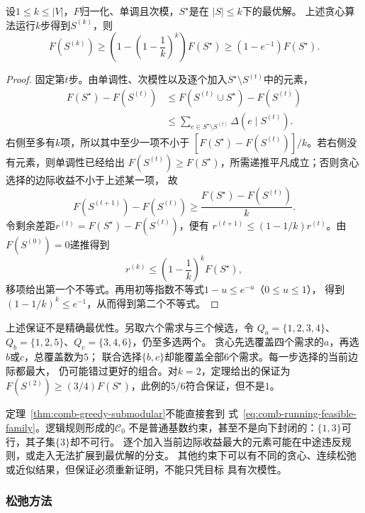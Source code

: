 \begin{theorem}[单调次模最大化的贪心界]
\label{thm:comb-greedy-submodular}
设$1\leq k\leq|V|$，$F$归一化、单调且次模，$S^\star$是在
$|S|\leq k$下的最优解。
上述贪心算法运行$k$步得到$S^{(k)}$，则
\begin{equation}
  F(S^{(k)})
  \geq
  \left(1-\left(1-\frac1k\right)^k\right)F(S^\star)
  \geq(1-e^{-1})F(S^\star).
  \label{eq:comb-greedy-bound}
\end{equation}
\end{theorem}

\begin{proof}
固定第$t$步。由单调性、次模性以及逐个加入$S^\star\setminus S^{(t)}$中的元素，
\begin{align*}
  F(S^\star)-F(S^{(t)})
  &\leq F(S^{(t)}\cup S^\star)-F(S^{(t)})\\
  &\leq\sum_{e\in S^\star\setminus S^{(t)}}\Delta(e\mid S^{(t)}).
\end{align*}
右侧至多有$k$项，所以其中至少一项不小于
$[F(S^\star)-F(S^{(t)})]/k$。若右侧没有元素，则单调性已经给出
$F(S^{(t)})\geq F(S^\star)$，所需递推平凡成立；否则贪心选择的边际收益不小于上述某一项，
故
\[
  F(S^{(t+1)})-F(S^{(t)})
  \geq\frac{F(S^\star)-F(S^{(t)})}{k}.
\]
令剩余差距$r^{(t)}=F(S^\star)-F(S^{(t)})$，便有
$r^{(t+1)}\leq(1-1/k)r^{(t)}$。由$F(S^{(0)})=0$递推得到
\[
  r^{(k)}\leq\left(1-\frac1k\right)^kF(S^\star),
\]
移项给出第一个不等式。再用初等指数不等式$1-u\leq e^{-u}$（$0\leq u\leq1$），
得到$(1-1/k)^k\leq e^{-1}$，从而得到第二个不等式。
\end{proof}

上述保证不是精确最优性。另取六个需求与三个候选，令
$Q_a=\{1,2,3,4\}$、$Q_b=\{1,2,5\}$、$Q_c=\{3,4,6\}$，仍至多选两个。
贪心先选覆盖四个需求的$a$，再选$b$或$c$，总覆盖数为$5$；
联合选择$\{b,c\}$却能覆盖全部$6$个需求。每一步选择的当前边际都最大，
仍可能错过更好的组合。对$k=2$，定理给出的保证为
$F(S^{(2)})\geq(3/4)F(S^\star)$，此例的$5/6$符合保证，但不是$1$。

定理~\ref{thm:comb-greedy-submodular}不能直接套到
式~\eqref{eq:comb-running-feasible-family}。逻辑规则形成的$\mathcal{C}_0$
不是普通基数约束，甚至不是向下封闭的：$\{1,3\}$可行，其子集$\{3\}$却不可行。
逐个加入当前边际收益最大的元素可能在中途违反规则，或走入无法扩展到最优解的分支。
其他约束下可以有不同的贪心、连续松弛或近似结果，但保证必须重新证明，不能只凭目标
具有次模性。

\subsubsection{松弛方法}
\label{sec:comb-relaxation-method}

